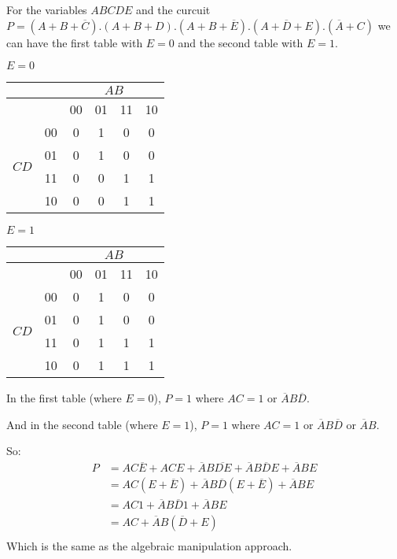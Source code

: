 \documentclass[10pt,\jkfside,a4paper]{article}
\begin{document}
\begin{enumerate}
\begin{enumerate}
For the variables $ABCDE$ and the curcuit $P = (A + B + \overline C).(A + B + D).(A + B + \overline E).(A + \overline D + E).(\overline A + C)$ we can have the first table with $E=0$ and the second table with $E=1$.
\begin{center}
$E = 0$
\begin{tabular}{|c|c|c|c|c|c|} 
\hline
& & \multicolumn{4}{|c|}{$AB$} \\
\hline
& & 00 & 01 & 11 & 10 \\ 
\hline
\multirow{4}{2em}{$CD$} 
& 00 & 0 & 1 & 0 & 0 \\
& 01 & 0 & 1 & 0 & 0 \\
& 11 & 0 & 0 & 1 & 1 \\
& 10 & 0 & 0 & 1 & 1 \\
\hline
\end{tabular}
$E = 1$
\begin{tabular}{|c|c|c|c|c|c|} 
\hline
& & \multicolumn{4}{|c|}{$AB$} \\
\hline
& & 00 & 01 & 11 & 10 \\ 
\hline
\multirow{4}{2em}{$CD$} 
& 00 & 0 & 1 & 0 & 0 \\
& 01 & 0 & 1 & 0 & 0 \\
& 11 & 0 & 1 & 1 & 1 \\
& 10 & 0 & 1 & 1 & 1 \\
\hline
\end{tabular}
\end{center}
In the first table (where $E = 0$), $P = 1$ where $AC = 1$ or $\overline AB\overline D$.

And in the second table (where $E = 1$), $P = 1$ where $AC = 1$ or $\overline AB\overline D$ or $\overline AB$.

So:
\begin{equation*}
\begin{split}
P &= AC\overline E + ACE + \overline AB\overline{DE} + \overline AB\overline{D}E + \overline ABE\\
&= AC(E + \overline E) + \overline AB\overline D(E + \overline E) + \overline ABE\\
&= AC1 + \overline AB\overline D1 + \overline ABE\\
&= AC + \overline AB(\overline D + E)\\
\end{split}
\end{equation*}
Which is the same as the algebraic manipulation approach.
\end{enumerate}
\end{enumerate}
\end{document}
